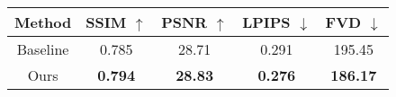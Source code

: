 \begin{tabular}{@{}ccccc@{}}
\toprule
Method         & SSIM $\uparrow$                      & PSNR $\uparrow$                     & LPIPS $\downarrow$                    & FVD  $\downarrow$                      \\ \midrule
Baseline  & 0.785           & 28.71            & 0.291        & 195.45   \\
Ours           & \textbf{0.794}            & \textbf{28.83}            & \textbf{0.276}            & \textbf{186.17}            \\ \bottomrule
\end{tabular}